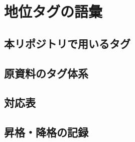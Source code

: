 
\section{地位タグの語彙}

\subsection{本リポジトリで用いるタグ}

\subsection{原資料のタグ体系}

\subsection{対応表}

\subsection{昇格・降格の記録}
